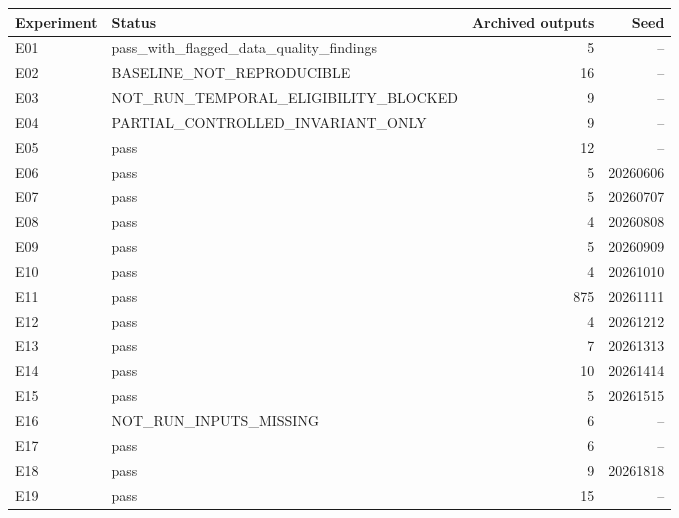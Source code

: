 \begin{tabular}{llrr}
Experiment & Status & Archived outputs & Seed \\
\hline
E01 & pass\_with\_flagged\_data\_quality\_findings & 5 & -- \\
E02 & BASELINE\_NOT\_REPRODUCIBLE & 16 & -- \\
E03 & NOT\_RUN\_TEMPORAL\_ELIGIBILITY\_BLOCKED & 9 & -- \\
E04 & PARTIAL\_CONTROLLED\_INVARIANT\_ONLY & 9 & -- \\
E05 & pass & 12 & -- \\
E06 & pass & 5 & 20260606 \\
E07 & pass & 5 & 20260707 \\
E08 & pass & 4 & 20260808 \\
E09 & pass & 5 & 20260909 \\
E10 & pass & 4 & 20261010 \\
E11 & pass & 875 & 20261111 \\
E12 & pass & 4 & 20261212 \\
E13 & pass & 7 & 20261313 \\
E14 & pass & 10 & 20261414 \\
E15 & pass & 5 & 20261515 \\
E16 & NOT\_RUN\_INPUTS\_MISSING & 6 & -- \\
E17 & pass & 6 & -- \\
E18 & pass & 9 & 20261818 \\
E19 & pass & 15 & -- \\
\end{tabular}
